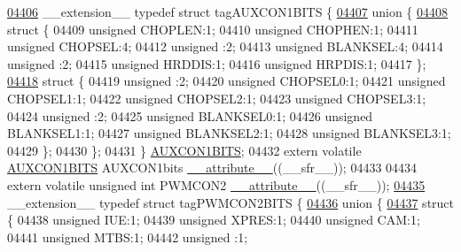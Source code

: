 \begin{DoxyCode}
\hypertarget{a00015_source_l04406}{}\hyperlink{a00014}{04406} \_\_extension\_\_ \textcolor{keyword}{typedef} \textcolor{keyword}{struct }tagAUXCON1BITS \{
\hypertarget{a00015_source_l04407}{}\hyperlink{a00015}{04407}   \textcolor{keyword}{union }\{
\hypertarget{a00015_source_l04408}{}\hyperlink{a00015}{04408}     \textcolor{keyword}{struct }\{
04409       \textcolor{keywordtype}{unsigned} CHOPLEN:1;
04410       \textcolor{keywordtype}{unsigned} CHOPHEN:1;
04411       \textcolor{keywordtype}{unsigned} CHOPSEL:4;
04412       \textcolor{keywordtype}{unsigned} :2;
04413       \textcolor{keywordtype}{unsigned} BLANKSEL:4;
04414       \textcolor{keywordtype}{unsigned} :2;
04415       \textcolor{keywordtype}{unsigned} HRDDIS:1;
04416       \textcolor{keywordtype}{unsigned} HRPDIS:1;
04417     \};
\hypertarget{a00015_source_l04418}{}\hyperlink{a00015}{04418}     \textcolor{keyword}{struct }\{
04419       \textcolor{keywordtype}{unsigned} :2;
04420       \textcolor{keywordtype}{unsigned} CHOPSEL0:1;
04421       \textcolor{keywordtype}{unsigned} CHOPSEL1:1;
04422       \textcolor{keywordtype}{unsigned} CHOPSEL2:1;
04423       \textcolor{keywordtype}{unsigned} CHOPSEL3:1;
04424       \textcolor{keywordtype}{unsigned} :2;
04425       \textcolor{keywordtype}{unsigned} BLANKSEL0:1;
04426       \textcolor{keywordtype}{unsigned} BLANKSEL1:1;
04427       \textcolor{keywordtype}{unsigned} BLANKSEL2:1;
04428       \textcolor{keywordtype}{unsigned} BLANKSEL3:1;
04429     \};
04430   \};
04431 \} \hyperlink{a00014_d2/da3/a00115}{AUXCON1BITS};
04432 \textcolor{keyword}{extern} \textcolor{keyword}{volatile} \hyperlink{a00014_d2/da3/a00115}{AUXCON1BITS} AUXCON1bits \hyperlink{a00015_a493c46f03454991ccc5aa7a6e1dfb2a7}{\_\_attribute\_\_}((\_\_sfr\_\_));
04433 
04434 \textcolor{keyword}{extern} \textcolor{keyword}{volatile} \textcolor{keywordtype}{unsigned} \textcolor{keywordtype}{int}  PWMCON2 \hyperlink{a00015_a493c46f03454991ccc5aa7a6e1dfb2a7}{\_\_attribute\_\_}((\_\_sfr\_\_));
\hypertarget{a00015_source_l04435}{}\hyperlink{a00014}{04435} \_\_extension\_\_ \textcolor{keyword}{typedef} \textcolor{keyword}{struct }tagPWMCON2BITS \{
\hypertarget{a00015_source_l04436}{}\hyperlink{a00015}{04436}   \textcolor{keyword}{union }\{
\hypertarget{a00015_source_l04437}{}\hyperlink{a00015}{04437}     \textcolor{keyword}{struct }\{
04438       \textcolor{keywordtype}{unsigned} IUE:1;
04439       \textcolor{keywordtype}{unsigned} XPRES:1;
04440       \textcolor{keywordtype}{unsigned} CAM:1;
04441       \textcolor{keywordtype}{unsigned} MTBS:1;
04442       \textcolor{keywordtype}{unsigned} :1;

\end{DoxyCode}
